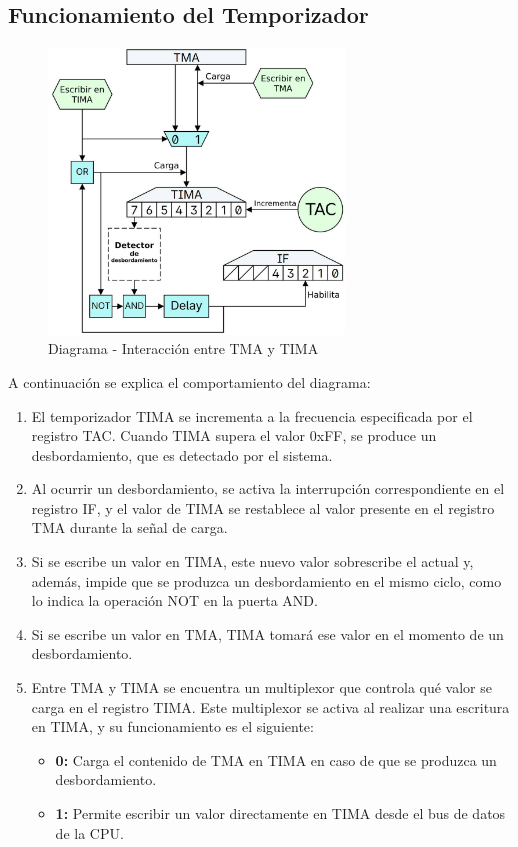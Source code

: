 \subsection{Funcionamiento del Temporizador}

\begin{figure}[h]
    \centering
    \includegraphics[width=0.7\textwidth]{include/images/tmatactima.jpg}
    \caption{Diagrama - Interacción entre TMA y TIMA}
    \label{figure:tmatima}
\end{figure}

A continuación se explica el comportamiento del diagrama:

\begin{enumerate} 
    \item El temporizador TIMA se incrementa a la frecuencia especificada por el registro TAC. Cuando TIMA supera el valor 0xFF, se produce un desbordamiento, que es detectado por el sistema. 
    \item Al ocurrir un desbordamiento, se activa la interrupción correspondiente en el registro IF, y el valor de TIMA se restablece al valor presente en el registro TMA durante la señal de carga. 
    \item Si se escribe un valor en TIMA, este nuevo valor sobrescribe el actual y, además, impide que se produzca un desbordamiento en el mismo ciclo, como lo indica la operación NOT en la puerta AND. 
    \item Si se escribe un valor en TMA, TIMA tomará ese valor en el momento de un desbordamiento. 
    \item Entre TMA y TIMA se encuentra un multiplexor que controla qué valor se carga en el registro TIMA. Este multiplexor se activa al realizar una escritura en TIMA, y su funcionamiento es el siguiente: 
    \begin{itemize} 
        \item \textbf{0:} Carga el contenido de TMA en TIMA en caso de que se produzca un desbordamiento. 
        \item \textbf{1:} Permite escribir un valor directamente en TIMA desde el bus de datos de la CPU. 
    \end{itemize} 
\end{enumerate}

